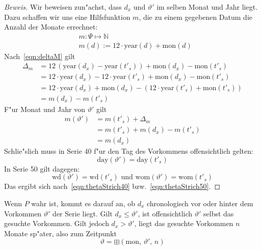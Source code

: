 \documentclass[a4paper]{article}
\newcommand*{\dayf}{\mathrm{day}}
\newcommand*{\monf}{\mathrm{mon}}
\newcommand*{\yearf}{\mathrm{year}}
\newcommand*{\wdf}{\mathrm{wd}}
\newcommand*{\womf}{\mathrm{wom}}
\newcommand*{\addff}{\boxplus}
\numberwithin{equation}{section}
\begin{document}
\begin{proof}[Beweis]
  Wir beweisen zun"achst, dass $d_x$ und $\vartheta'$ im selben Monat und Jahr
  liegt. Dazu schaffen wir uns eine Hilfsfunktion $m$, die zu einem gegebenen
  Datum die Anzahl der Monate errechnet:
  \begin{equation}
  \begin{split}
    & m : \Psi \mapsto \mathbb{N} \\
    & m(d) := 12\cdot\yearf(d) + \monf(d)
  \end{split}
  \end{equation}
  Nach~\eqref{eqn:deltaM} gilt
  \begin{equation}
  \begin{split}
    \Delta_m & = 12\,(\yearf(d_x)-\yearf(t'_s)) + \monf(d_x) - \monf(t'_s) \\
      & = 12\cdot\yearf(d_x) - 12\cdot\yearf(t'_s) + \monf(d_x) - \monf(t'_s) \\
      & = 12\cdot\yearf(d_x) + \monf(d_x) - (12\cdot\yearf(t'_s) + \monf(t'_s)) \\
      & = m(d_x) - m(t'_s)
  \end{split}
  \end{equation}
  F"ur Monat und Jahr von $\vartheta'$ gilt
  \begin{equation}
  \begin{split}
    m(\vartheta') & = m(t'_s) + \Delta_m \\
      & = m(t'_s) + m(d_x) - m(t'_s) \\
      & = m(d_x)
  \end{split}
  \end{equation}
  Schlie"slich muss in Serie 40 f"ur den Tag des Vorkommens offensichtlich
  gelten:
  \begin{equation}\dayf(\vartheta') = \dayf(t'_s)\end{equation}
  In Serie 50 gilt dagegen:
  \begin{equation}
    \wdf(\vartheta') = \wdf(t'_s) \textrm{ und } \womf(\vartheta') = \womf(t'_s)
  \end{equation}
  Das ergibt sich nach~\eqref{eqn:thetaStrich40} bzw.~\eqref{eqn:thetaStrich50}.
\end{proof}

Wenn $P$ wahr ist, kommt es darauf an, ob $d_x$ chronologisch vor oder hinter
dem Vorkommen $\vartheta'$ der Serie liegt. Gilt $d_x \le \vartheta'$, ist
offensichtlich $\vartheta'$ selbst das gesuchte Vorkommen. Gilt jedoch
$d_x > \vartheta'$, liegt das gesuchte Vorkommen $n$ Monate sp"ater, also zum
Zeitpunkt
\begin{equation*}\vartheta = \addff(\monf,\,\vartheta',\,n)\end{equation*}
\end{document}
